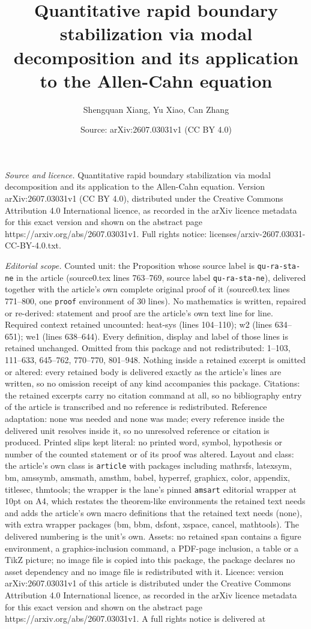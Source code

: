 \documentclass[10pt,a4paper]{amsart}
\title[Quantitative rapid boundary stabilization via modal decompos]{Quantitative rapid boundary stabilization via modal decomposition and its application to the Allen-Cahn equation}
\author{Shengquan Xiang, Yu Xiao, Can Zhang}
\date{Source: arXiv:2607.03031v1 (CC BY 4.0)}
\begin{document}
\maketitle

\noindent\emph{Source and licence.} Quantitative rapid boundary stabilization via modal decomposition and its application to the Allen-Cahn equation. Version arXiv:2607.03031v1 (CC BY 4.0), distributed under the Creative Commons Attribution 4.0 International licence, as recorded in the arXiv licence metadata for this exact version and shown on the abstract page https://arxiv.org/abs/2607.03031v1. Full rights notice: licenses/arxiv-2607.03031-CC-BY-4.0.txt.\par\smallskip

\noindent\textit{Editorial scope.} Counted unit: the Proposition whose source label is \texttt{qu-ra-sta-ne} in the article (source0.tex lines 763--769, source label \texttt{qu-ra-sta-ne}), delivered together with the article's own complete original proof of it (source0.tex lines 771--800, one \texttt{proof} environment of 30 lines). No mathematics is written, repaired or re-derived: statement and proof are the article's own text line for line. Required context retained uncounted: heat-sys (lines 104--110); w2 (lines 634--651); we1 (lines 638--644). Every definition, display and label of those lines is retained unchanged. Omitted from this package and not redistributed: 1--103, 111--633, 645--762, 770--770, 801--948. Nothing inside a retained excerpt is omitted or altered: every retained body is delivered exactly as the article's lines are written, so no omission receipt of any kind accompanies this package. Citations: the retained excerpts carry no citation command at all, so no bibliography entry of the article is transcribed and no reference is redistributed. Reference adaptation: none was needed and none was made; every reference inside the delivered unit resolves inside it, so no unresolved reference or citation is produced. Printed slips kept literal: no printed word, symbol, hypothesis or number of the counted statement or of its proof was altered. Layout and class: the article's own class is \texttt{article} with packages including mathrsfs, latexsym, bm, amssymb, amsmath, amsthm, babel, hyperref, graphicx, color, appendix, titlesec, thmtools; the wrapper is the lane's pinned \texttt{amsart} editorial wrapper at 10pt on A4, which restates the theorem-like environments the retained text needs and adds the article's own macro definitions that the retained text needs (none), with extra wrapper packages (bm, bbm, dsfont, xspace, cancel, mathtools). The delivered numbering is the unit's own. Assets: no retained span contains a figure environment, a graphics-inclusion command, a PDF-page inclusion, a table or a TikZ picture; no image file is copied into this package, the package declares no asset dependency and no image file is redistributed with it. Licence: version arXiv:2607.03031v1 of this article is distributed under the Creative Commons Attribution 4.0 International licence, as recorded in the arXiv licence metadata for this exact version and shown on the abstract page https://arxiv.org/abs/2607.03031v1. A full rights notice is delivered at 
\end{document}
